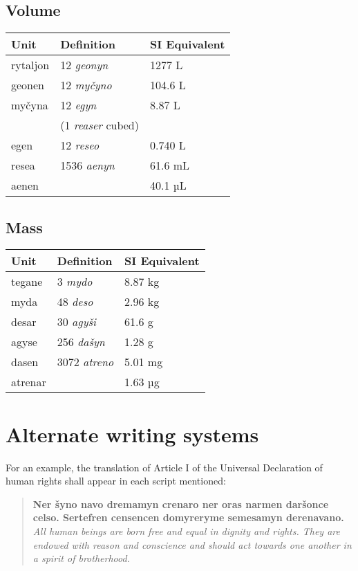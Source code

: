 \documentclass{book}
\begin{document}
\section{Volume}

\begin{center}
	\begin{tabular}{|l|l|l|}
		\hline
		Unit & Definition & SI Equivalent \\ \hline
		rytaljon & 12 \emph{geonyn} & 1277 L \\
		geonen & 12 \emph{myčyno} & 104.6 L \\
		myčyna & 12 \emph{egyn} & 8.87 L \\
		& (1 \emph{reaser} cubed) & \\
		egen & 12 \emph{reseo} & 0.740 L \\
		resea & 1536 \emph{aenyn} & 61.6 mL \\
		aenen & & 40.1 µL \\ \hline
	\end{tabular}
\end{center}

\section{Mass}

\begin{center}
	\begin{tabular}{|l|l|l|}
		\hline
		Unit & Definition & SI Equivalent \\ \hline
		tegane & 3 \emph{mydo} & 8.87 kg \\
		myda & 48 \emph{deso} & 2.96 kg \\
		desar & 30 \emph{agyši} & 61.6 g \\
		agyse & 256 \emph{dašyn} & 1.28 g \\
		dasen & 3072 \emph{atreno} & 5.01 mg \\
		atrenar & & 1.63 µg \\ \hline
	\end{tabular}
\end{center}

\chapter{Alternate writing systems}

For an example, the translation of Article I of the Universal Declaration of human rights shall appear in each script mentioned:

\begin{verse}
    \textbf{
        Ner šyno navo dremamyn crenaro ner oras narmen daršonce celso. Sertefren censencen domyreryme semesamyn derenavano.
    } \\
    \emph{All human beings are born free and equal in dignity and rights. They are endowed with reason and conscience and should act towards one another in a spirit of brotherhood.}
\end{verse}
\end{document}
